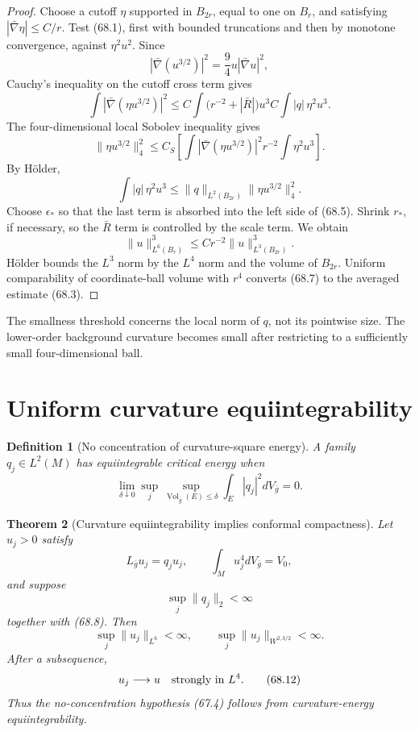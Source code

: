 \documentclass[11pt]{article}
\newtheorem{theorem}{Theorem}[section]
\newtheorem{definition}[theorem]{Definition}
\theoremstyle{remark}
\begin{document}
\begin{proof}
Choose a cutoff \(\eta\) supported in \(B_{2r}\), equal to one on
\(B_r\), and satisfying \(|\bar\nabla\eta|\leq C/r\).
Test (68.1), first with bounded truncations and then by monotone
convergence, against \(\eta^2u^2\).  Since
\[
 |\bar\nabla(u^{3/2})|^2=\frac94u|\bar\nabla u|^2,
\]
Cauchy's inequality on the cutoff cross term gives
\[
 \int|\bar\nabla(\eta u^{3/2})|^2
 \leq
 C\int
 \bigl(r^{-2}+|\bar R|\bigr)u^3
 C\int |q|\,\eta^2u^3.                                \tag{68.4}
\]
The four-dimensional local Sobolev inequality gives
\[
 \|\eta u^{3/2}\|_4^2
 \leq C_S\left[
 \int|\bar\nabla(\eta u^{3/2})|^2
 r^{-2}\int\eta^2u^3
 \right].                                             \tag{68.5}
\]
By H\"older,
\[
 \int |q|\,\eta^2u^3
 \leq
 \|q\|_{L^2(B_{2r})}
 \|\eta u^{3/2}\|_4^2.                                \tag{68.6}
\]
Choose \(\epsilon_*\) so that the last term is absorbed into the
left side of (68.5).  Shrink \(r_*\), if necessary, so the
\(\bar R\) term is controlled by the scale term.  We obtain
\[
 \|u\|_{L^6(B_r)}^3
 \leq Cr^{-2}\|u\|_{L^3(B_{2r})}^3.                   \tag{68.7}
\]
H\"older bounds the \(L^3\) norm by the \(L^4\) norm and the volume
of \(B_{2r}\).  Uniform comparability of coordinate-ball volume
with \(r^4\) converts (68.7) to the averaged estimate (68.3).
\end{proof}

The smallness threshold concerns the local norm of \(q\), not its
pointwise size.  The lower-order background curvature becomes
small after restricting to a sufficiently small four-dimensional
ball.

\section{Uniform curvature equiintegrability}

\begin{definition}[No concentration of curvature-square energy]
\label{def:v15v68-q-equi}
A family \(q_j\in L^2(M)\) has equiintegrable critical energy when
\[
 \lim_{\delta\downarrow0}
 \sup_j\sup_{\operatorname{Vol}_{\bar g}(E)\leq\delta}
 \int_E|q_j|^2dV_{\bar g}=0.                           \tag{68.8}
\]
\end{definition}

\begin{theorem}[Curvature equiintegrability implies conformal compactness]
\label{thm:v15v68-global}
Let \(u_j>0\) satisfy
\[
 L_{\bar g}u_j=q_ju_j,\qquad
 \int_Mu_j^4dV_{\bar g}=V_0,                           \tag{68.9}
\]
and suppose
\[
 \sup_j\|q_j\|_2<\infty                                \tag{68.10}
\]
together with (68.8).  Then
\[
 \sup_j\|u_j\|_{L^6}<\infty,\qquad
 \sup_j\|u_j\|_{W^{2,3/2}}<\infty.                    \tag{68.11}
\]
After a subsequence,
\[
 u_j\longrightarrow u\quad\hbox{strongly in }L^4.     \tag{68.12}
\]
Thus the no-concentration hypothesis (67.4) follows from
curvature-energy equiintegrability.
\end{theorem}
\end{document}

